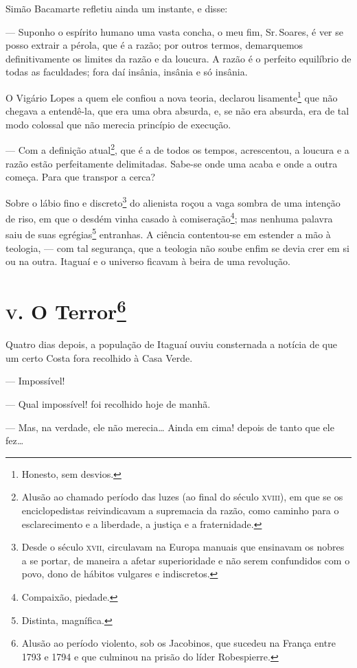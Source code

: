 Simão Bacamarte refletiu ainda um instante, e disse:

--- Suponho o espírito humano uma vasta concha, o meu fim, Sr.\,Soares, é
ver se posso extrair a pérola, que é a razão; por outros termos,
demarquemos definitivamente os limites da razão e da loucura. A razão é
o perfeito equilíbrio de todas as faculdades; fora daí insânia, insânia
e só insânia.

O Vigário Lopes a quem ele confiou a nova teoria, declarou
lisamente\footnote{Honesto, sem desvios.} que não chegava a entendê-la,
que era uma obra absurda, e, se não era absurda, era de tal modo
colossal que não merecia princípio de execução.

--- Com a definição atual\footnote{Alusão ao chamado período das luzes
  (ao final do século \textsc{xviii}), em que se os enciclopedistas reivindicavam
  a supremacia da razão, como caminho para o esclarecimento e a
  liberdade, a justiça e a fraternidade.}, que é a de todos os tempos,
acrescentou, a loucura e a razão estão perfeitamente delimitadas.
Sabe-se onde uma acaba e onde a outra começa. Para que transpor a cerca?

Sobre o lábio fino e discreto\footnote{Desde o século \textsc{xvii}, circulavam
  na Europa manuais que ensinavam os nobres a se portar, de maneira a
  afetar superioridade e não serem confundidos com o povo, dono de
  hábitos vulgares e indiscretos.} do alienista roçou a vaga sombra de
uma intenção de riso, em que o desdém vinha casado à
comiseração\footnote{Compaixão, piedade.}; mas nenhuma palavra saiu de
suas egrégias\footnote{Distinta, magnífica.} entranhas. A ciência
contentou-se em estender a mão à teologia, --- com tal segurança, que a
teologia não soube enfim se devia crer em si ou na outra. Itaguaí e o
universo ficavam à beira de uma revolução.

\chapter{\textsc{v.} O Terror\footnote{Alusão ao período violento, sob os Jacobinos,
  que sucedeu na França entre 1793 e 1794 e que culminou na prisão do
  líder Robespierre.}}

Quatro dias depois, a população de Itaguaí ouviu consternada a notícia
de que um certo Costa fora recolhido à Casa Verde.

--- Impossível!

--- Qual impossível! foi recolhido hoje de manhã.

--- Mas, na verdade, ele não merecia\ldots{} Ainda em cima! depois de
tanto que ele fez\ldots{}

